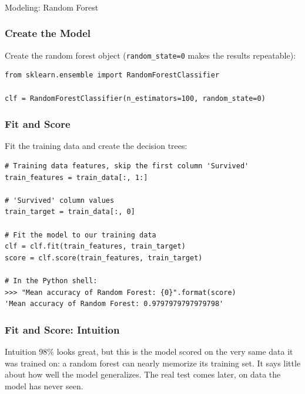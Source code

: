 \begin{frame}[fragile]\frametitle{}
\begin{center}
{\Large Modeling: Random Forest}
\end{center}
\end{frame}

\begin{frame}[fragile]\frametitle{Create the Model}
Create the random forest object (\texttt{random\_state=0} makes the results repeatable):
\begin{lstlisting}
from sklearn.ensemble import RandomForestClassifier

clf = RandomForestClassifier(n_estimators=100, random_state=0)
\end{lstlisting}
\end{frame}

\begin{frame}[fragile]\frametitle{Fit and Score}
Fit the training data and create the decision trees:
\begin{lstlisting}
# Training data features, skip the first column 'Survived'
train_features = train_data[:, 1:]

# 'Survived' column values
train_target = train_data[:, 0]

# Fit the model to our training data
clf = clf.fit(train_features, train_target)
score = clf.score(train_features, train_target)

# In the Python shell:
>>> "Mean accuracy of Random Forest: {0}".format(score)
'Mean accuracy of Random Forest: 0.9797979797979798'
\end{lstlisting}
\end{frame}

\begin{frame}[fragile]\frametitle{Fit and Score: Intuition}
\begin{block}{Intuition}
98\% looks great, but this is the model scored on the very same data it was trained on: a
random forest can nearly memorize its training set. It says little about how well the
model generalizes. The real test comes later, on data the model has never seen.
\end{block}
\end{frame}



